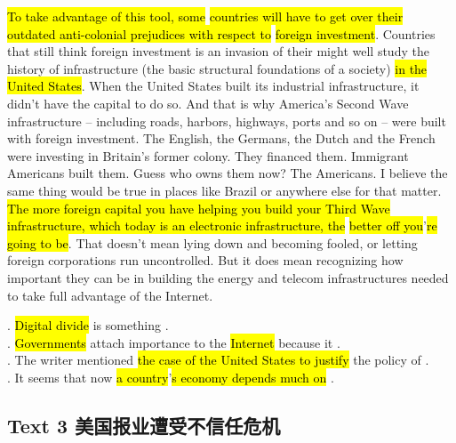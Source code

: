 \hl{To take advantage of this tool, some}  \hl{countries will have to get over their outdated anti-colonial prejudices with respect to} \hl{foreign investment}. Countries that still think foreign investment is an 
invasion of their 
 might well study the history of infrastructure (the basic structural foundations of a society) \hl{in the United States}. When the United States built its industrial infrastructure, it didn’t have the 
capital to do so. And that is why America’s Second Wave 
infrastructure -- including roads, harbors, highways, ports and so on -- were built with foreign investment. The English, the Germans, the Dutch and the French were investing in Britain’s former colony. They financed them. Immigrant Americans built them. Guess who owns them now? The Americans. I believe the same thing would be true in places like Brazil or anywhere else for that matter. \hl{The more foreign capital you have helping you build your Third Wave infrastructure, which today is an electronic infrastructure, the} 
\hl{better off you}’\hl{re going to be}. That doesn’t mean 
lying down and becoming fooled, or letting foreign corporations run uncontrolled. But it does mean recognizing how important they can be in building the energy and telecom infrastructures needed to take full advantage of the Internet.
\begin{questions}  .	\hl{Digital divide} is something \ltk{}.\\
 .	\hl{Governments} attach importance to the \hl{Internet} because it \ltk{}.\\
 .	The writer mentioned \hl{the case of the United States to justify} the policy of \ltk{}.\\
 .	It seems that now \hl{a country}’\hl{s economy depends much on} \ltk{}.\\
\end{questions}    \subsection{Text 3 美国报业遭受不信任危机}
